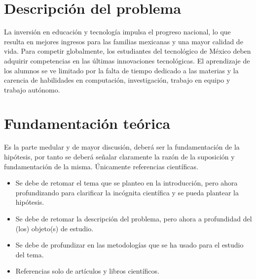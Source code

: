     \section{Descripción del problema}
% 
% 
La inversión en educación y tecnología impulsa el progreso nacional, lo que resulta en mejores ingresos para las familias mexicanas y una mayor calidad de vida.
Para competir globalmente, los estudiantes del tecnológico de México deben adquirir competencias en las últimas innovaciones tecnológicas.
El aprendizaje de los alumnos se ve limitado por la falta de tiempo dedicado a las materias y la carencia de habilidades en computación, investigación, trabajo en equipo y trabajo autónomo.
%
%
    \section{Fundamentación teórica}
    
    Es la parte medular y de mayor discusión, deberá ser la fundamentación de la hipótesis, por tanto se deberá señalar claramente la razón de la suposición y fundamentación de la misma. Únicamente referencias científicas.
    \begin{itemize}
        \item Se debe de retomar el tema que se planteo en la introducción, pero ahora profundizando para clarificar la incógnita científica y se pueda plantear la hipótesis.
        \item Se debe de retomar la descripción del problema, pero ahora a profundidad del (los) objeto(s) de estudio. 
        \item Se debe de profundizar en las metodologías que se ha usado para el estudio del tema.
        \item Referencias solo de artículos y libros científicos.
    \end{itemize}
% 
% 
% 
% 
